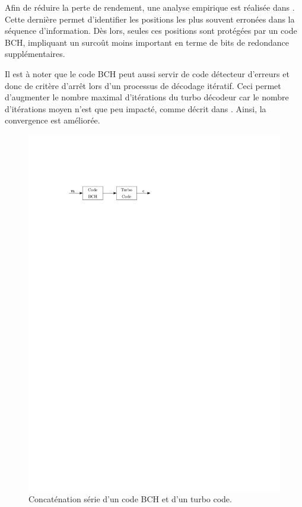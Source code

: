 Afin de réduire la perte de rendement, une analyse empirique est réalisée dans \cite{narayananBCH}. Cette dernière 
permet d’identifier les positions les plus souvent erronées dans la séquence d'information. Dès lors, seules ces 
positions sont protégées par un code BCH, impliquant un surcoût moins important en terme de bits de redondance
supplémentaires.

Il est à noter que le code BCH peut aussi servir de code détecteur d'erreurs et donc de critère d’arrêt lors d'un 
processus de décodage itératif. Ceci permet d'augmenter le nombre maximal d'itérations du turbo décodeur car le nombre 
d'itérations moyen n'est que peu impacté, comme décrit dans \cite{takeshitaBCH}. Ainsi, la convergence est améliorée.

\begin{figure}[!tb]
	\begin{center}
	\includegraphics[]{main/ch1_fig/abaiss/bch.pdf}
	\end{center}
	\caption{\label{fig:bchc} Concaténation série d'un code BCH et d'un turbo code.}
\end{figure}


